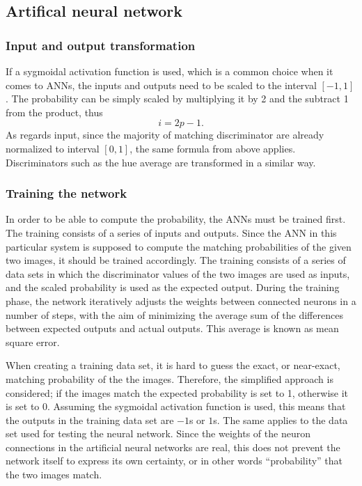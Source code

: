 \documentclass[times, utf8, zavrsni]{fer}
\begin{document}
\subsection{Artifical neural network}

\subsubsection{Input and output transformation}

If a sygmoidal activation function is used, which is a common choice when it
comes to ANNs, the inputs and outputs need to be scaled to the interval $[-1,
1]$. The probability can be simply scaled by multiplying it by 2 and the
subtract 1 from the product, thus
\[i = 2 p - 1 .\]
As regards input, since the majority of matching discriminator are already
normalized to interval $[0, 1]$, the same formula from above applies.
Discriminators such as the hue average are transformed in a similar way. 

\subsubsection{Training the network}

In order to be able to compute the probability, the ANNs must be trained first.
The training consists of a series of inputs and outputs. Since the ANN in this
particular system is supposed to compute the matching probabilities of the given
two images, it should be trained accordingly. The training consists of a series
of data sets in which the discriminator values of the two images are used as
inputs, and the scaled probability is used as the expected output. 
During the training phase, the network iteratively adjusts the weights between
connected neurons in a number of steps, with the aim of minimizing the average
sum of the differences between expected outputs and actual outputs. This
average is known as mean square error.

When creating a training data set, it is hard to guess the exact, or near-exact,
matching probability of the the images. Therefore, the simplified approach is
considered; if the images match the expected probability is set to 1, otherwise
it is set to 0. Assuming the sygmoidal activation function is used, this means
that the outputs in the training data set are $-1$s or $1$s. The
same applies to the data set used for testing the neural network.
Since the weights of the neuron connections in the artificial neural networks
are real, this does not prevent the network itself to express its own certainty,
or in other words ``probability'' that the two images match.
\end{document}

